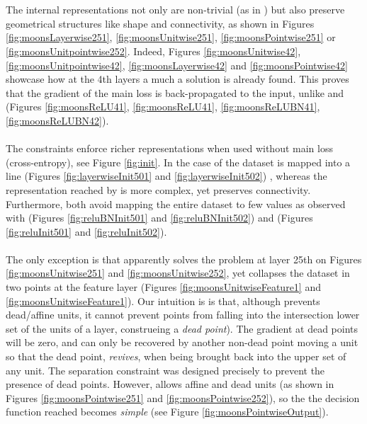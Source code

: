 \\\\ 
The internal representations not only are non-trivial (as in \ReLUBN) but also preserve geometrical structures like shape and connectivity, as shown in Figures \ref{fig:moonsLayerwise251}, \ref{fig:moonsUnitwise251}, \ref{fig:moonsPointwise251} or \ref{fig:moonsUnitpointwise252}. Indeed, Figures \ref{fig:moonsUnitwise42}, \ref{fig:moonsUnitpointwise42}, \ref{fig:moonsLayerwise42} and \ref{fig:moonsPointwise42} showcase how at the 4th layers a much a solution is already found. This proves that the gradient of the main loss is back-propagated to the input, unlike \ReLU and \ReLUBN (Figures \ref{fig:moonsReLU41}, \ref{fig:moonsReLU41}, \ref{fig:moonsReLUBN41}, \ref{fig:moonsReLUBN42}).
\\\\
The constraints enforce richer representations when used without main loss (cross-entropy), see Figure \ref{fig:init}. In the case of \SepLayer the dataset is mapped into a line (Figures \ref{fig:layerwiseInit501} and \ref{fig:layerwiseInit502}) , whereas the representation reached by \SepUnitPoint is more complex, yet preserves connectivity. Furthermore, both avoid mapping the entire dataset to few values as observed with \ReLU (Figures \ref{fig:reluBNInit501} and \ref{fig:reluBNInit502}) and \ReLUBN (Figures \ref{fig:reluInit501} and \ref{fig:reluInit502}). 
\\\\
The only exception is \SepUnit that apparently solves the problem at layer 25th on Figures \ref{fig:moonsUnitwise251} and \ref{fig:moonsUnitwise252}, yet collapses the dataset in two points at the feature layer (Figures \ref{fig:moonsUnitwiseFeature1} and \ref{fig:moonsUnitwiseFeature1}). Our intuition is  is that, although \SepUnit prevents dead/affine units, it cannot prevent points from falling into the intersection lower set of the units of a layer, construeing a \emph{dead point}). The gradient at dead points will be zero, and can only be recovered by another non-dead point moving a unit so that the dead point, \emph{revives}, when being brought back into the upper set of any unit. The \SepPoint separation constraint was designed precisely to prevent the presence of dead points. However, \SepPoint allows affine and dead units (as shown in Figures \ref{fig:moonsPointwise251} and \ref{fig:moonsPointwise252}), so the the decision function reached becomes \emph{simple} (see Figure \ref{fig:moonsPointwiseOutput}). 
\\\\
